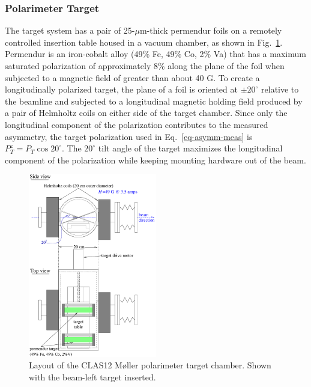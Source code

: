 \subsubsection{Polarimeter Target}
\label{sec-PolTgt}

The target system has a pair of 25-$\mu$m-thick permendur foils on a remotely controlled insertion table housed in a vacuum 
chamber, as shown in Fig.~\ref{fig-MPtgt}. Permendur is an iron-cobalt alloy (49\% Fe, 49\% Co, 2\% Va) that has a maximum saturated polarization
of approximately 8\% along the plane of the foil when subjected to a magnetic field of greater than about 40 G. To create a longitudinally 
polarized target, the plane of a foil is 
oriented at $\pm 20^\circ$ relative to the beamline and subjected to a longitudinal magnetic holding field produced by a pair of Helmholtz 
coils on either side of the target chamber. Since only the longitudinal component of the polarization contributes to the
measured asymmetry, the target polarization used in Eq.~\ref{eq-asymm-meas} is $P_T^z=P_T\cos 20^\circ$. The $ 20^\circ$ tilt angle of the 
target maximizes the longitudinal component of the polarization while keeping mounting hardware out of the beam.

\begin{figure}[hbtp]
 \begin{center}
  \includegraphics[width=0.5\textwidth]{MPtgt.pdf}
 \end{center}
	 \caption[]{Layout of the CLAS12 M{\o}ller polarimeter target chamber. Shown with the beam-left target inserted.}
 \label{fig-MPtgt}
\end{figure}


